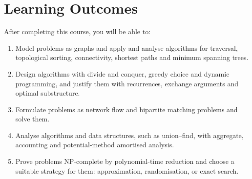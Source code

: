 \documentclass[11pt,a4paper]{article}
\begin{document}
\section{Learning Outcomes}
After completing this course, you will be able to:
\begin{enumerate}[label=LO\arabic*.]
  \item Model problems as graphs and apply and analyse algorithms for traversal, topological sorting, connectivity, shortest paths and minimum spanning trees.
  \item Design algorithms with divide and conquer, greedy choice and dynamic programming, and justify them with recurrences, exchange arguments and optimal substructure.
  \item Formulate problems as network flow and bipartite matching problems and solve them.
  \item Analyse algorithms and data structures, such as union--find, with aggregate, accounting and potential-method amortised analysis.
  \item Prove problems NP-complete by polynomial-time reduction and choose a suitable strategy for them: approximation, randomisation, or exact search.
\end{enumerate}
\end{document}
